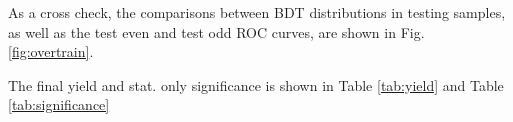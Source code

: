 As a cross check, the comparisons between BDT distributions in testing samples, as well as the test even and test odd ROC curves, are shown in Fig. \ref{fig:overtrain}.



The final yield and stat. only significance is shown in Table \ref{tab:yield} and Table \ref{tab:significance}








